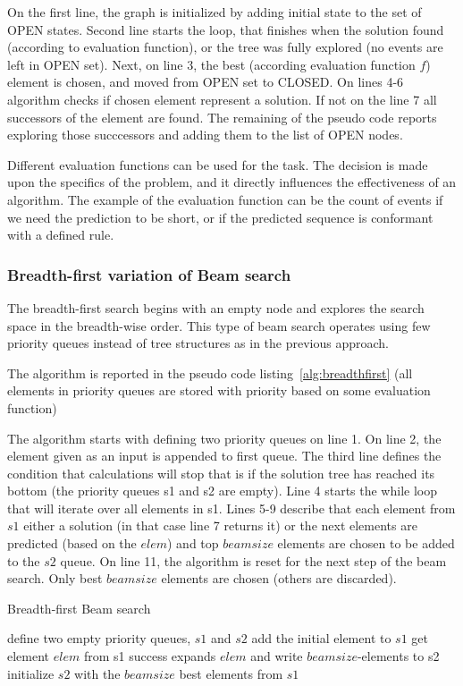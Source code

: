 On the first line, the graph is initialized by adding initial state to the set of OPEN states. 
Second line starts the loop, that finishes when the solution found (according to evaluation function), or the tree was fully explored (no events are left in OPEN set). Next, on line 3, the best (according evaluation function $f$) element is chosen, and moved from OPEN set to CLOSED. On lines 4-6 algorithm checks if chosen element represent a solution. If not on the line 7 all successors of the element are found. The remaining of the pseudo code reports exploring those succcessors and adding them to the list of OPEN nodes. 

Different evaluation functions can be used for the task. The decision is made upon the specifics of the problem, and it directly influences the effectiveness of an algorithm. The example of the evaluation function can be the count of events if we need the prediction to be short, or if the predicted sequence is conformant with a defined rule.

\subsubsection{Breadth-first variation of Beam search}

The breadth-first search begins with an empty node and explores the search space in the breadth-wise order. This type of beam search operates using few priority queues instead of tree structures as in the previous approach. 

The algorithm is reported in the pseudo code listing~\ref{alg:breadthfirst} (all elements in priority queues are stored with priority based on some evaluation function)

The algorithm starts with defining two priority queues on line 1. On line 2, the element given as an input is appended to first queue. The third line defines the condition that calculations will stop that is if the solution tree has reached its bottom (the priority queues s1 and s2 are empty). Line 4 starts the while loop that will iterate over all elements in s1. Lines 5-9 describe that each element from $s1$ either a solution (in that case line 7 returns it) or the next elements are predicted (based on the $elem$) and top $beamsize$ elements are chosen to be added to the $s2$ queue. On line 11, the algorithm is reset for the next step of the beam search. Only best $beamsize$ elements are chosen (others are discarded).


\begin{algorithm}
 	\caption{Breadth-first Beam search}
	\label{alg:breadthfirst}
	\begin{algorithmic}[1]
		\State define two empty priority queues, $s1$ and $s2$
		\State add the initial element to $s1$
				\State get element $elem$ from s1
					\State	success
					\EndIf
					\State expands $elem$ and write $beamsize$-elements to s2
					\EndWhile
					\State initialize $s2$ with the $beamsize$ best elements from $s1$
					\EndWhile
	\end{algorithmic}
\end{algorithm}




